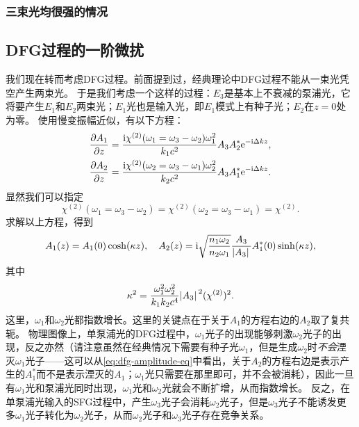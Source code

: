 \subsubsection{三束光均很强的情况}



\subsection{DFG过程的一阶微扰}

我们现在转而考虑DFG过程。前面提到过，经典理论中DFG过程不能从一束光凭空产生两束光。
于是我们考虑一个这样的过程：$E_3$是基本上不衰减的泵浦光，它将要产生$E_1$和$E_2$两束光；$E_1$光也是输入光，即$E_1$模式上有种子光；$E_2$在$z=0$处为零。
使用慢变振幅近似，有以下方程：
\begin{equation}
    \begin{aligned}
        \pdv{A_1}{z} &= \frac{\mathrm{i} \chi^{(2)}(\omega_1 = \omega_3 - \omega_2) \omega_1^2}{k_1 c^2} A_3 A_2^* \mathrm{e}^{-\mathrm{i} \Delta k z}, \\
        \pdv{A_2}{z} &= \frac{\mathrm{i} \chi^{(2)}(\omega_2 = \omega_3 - \omega_1) \omega_2^2}{k_2 c^2} A_3 A_1^* \mathrm{e}^{-\mathrm{i} \Delta k z}.
    \end{aligned}
    \label{eq:dfg-amplitude-eq}
\end{equation}
显然我们可以指定
\begin{equation}
    \chi^{(2)}(\omega_1 = \omega_3 - \omega_2) = \chi^{(2)}(\omega_2 = \omega_3 - \omega_1) = \chi^{(2)}.
\end{equation}
求解以上方程，得到
\begin{equation}
    A_1(z) = A_1(0) \cosh(\kappa z), \quad A_2(z) = \mathrm{i} \sqrt{\frac{n_1 \omega_2}{n_2 \omega_1}} \frac{A_3}{\abs*{A_3}} A_1^*(0) \sinh(\kappa z),
    \label{eq:dfg-amplitude}
\end{equation}
其中
\begin{equation}
    \kappa^2 = \frac{\omega_1^2 \omega_2^2}{k_1 k_2 c^4} \abs*{A_3}^2 (\chi^{(2)})^2 .
\end{equation}
这里，$\omega_1$和$\omega_2$光都指数增长。这里的关键点在于关于$A_1$的方程右边的$A_2$取了复共轭。
物理图像上，单泵浦光的DFG过程中，$\omega_1$光子的出现能够刺激$\omega_2$光子的出现，反之亦然（请注意虽然在经典情况下需要有种子光$\omega_1$，但是生成$\omega_2$时\emph{不会}湮灭$\omega_1$光子——这可以从\eqref{eq:dfg-amplitude-eq}中看出，关于$A_2$的方程右边是表示产生的$A_1^*$而不是表示湮灭的$A_1$；$\omega_1$光只需要在那里即可，并不会被消耗），因此一旦有$\omega_1$光和泵浦光同时出现，$\omega_1$光和$\omega_2$光就会不断扩增，从而指数增长。
反之，在单泵浦光输入的SFG过程中，产生$\omega_3$光子会消耗$\omega_2$光子，但是$\omega_3$光子不能诱发更多$\omega_1$光子转化为$\omega_2$光子，从而$\omega_2$光子和$\omega_3$光子存在竞争关系。


